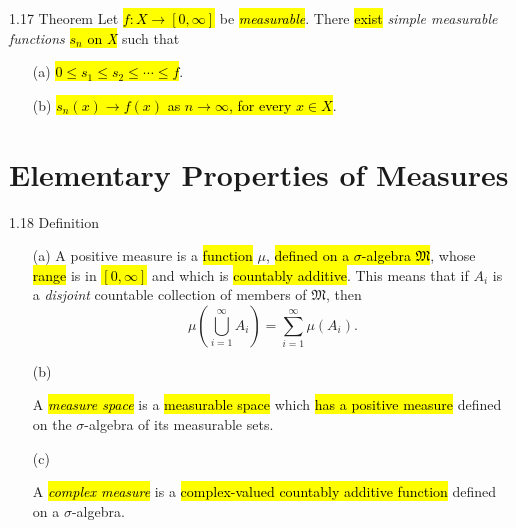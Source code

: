 \documentclass{article}
\begin{document}
\begin{theo}{1.17 Theorem}
Let \hl{$f: X\rightarrow[0,\infty]$} be \hl{\textit{measurable}}. There \hl{exist} \textit{simple measurable functions} \hl{$s_n$ on \textit{X}} such that
\begin{enumerate}
  \item [(a)] \hl{$0\le s_1\le s_2\le\cdots\le f$}.
  \item [(b)] \hl{$s_n(x)\rightarrow f(x)$ as $n\rightarrow\infty$, for every $x\in X$}.
\end{enumerate}
	
\end{theo}

\section*{Elementary Properties of Measures}

\begin{defi}{1.18 Definition}
\begin{enumerate}
  \item [(a)]
  A positive measure is a \hl{function} $\mu$, \hl{defined on a $\sigma$-algebra $\mathfrak{M}$}, whose \hl{range} is in \hl{$[0,\infty]$} and which is \hl{countably additive}. This means that if ${A_i}$ is a \textit{disjoint} countable collection of members of $\mathfrak{M}$, then 
  \begin{displaymath}
  \mu(\bigcup_{i=1}^\infty A_i)=\sum_{i=1}^\infty\mu(A_i).
\end{displaymath}

  \item [(b)]
  
  A \hl{\textit{measure space}} is a \hl{measurable space} which \hl{has a positive measure} defined on the $\sigma$-algebra of its measurable sets.
  \item [(c)] 
  
  A \hl{\textit{complex measure}} is a \hl{complex-valued countably additive function} defined on a $\sigma$-algebra.
\end{enumerate}

\end{defi}
\end{document}

